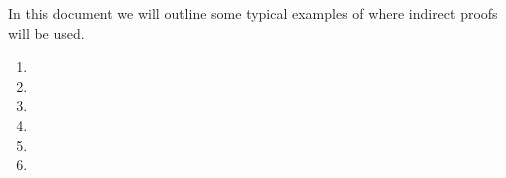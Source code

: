 In this document we will outline some typical examples of where indirect proofs will be used.
 \begin{enumerate}
   \item 
   \item 
   \item 
   \item 
   \item 
   \item 
 \end{enumerate}